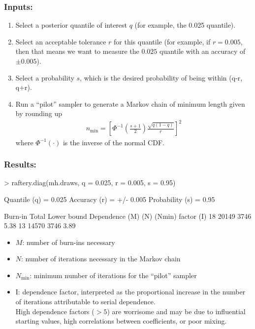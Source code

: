 \documentclass{beamer}
\begin{document}
\begin{frame}
\frametitle{Inputs:}
\pause
\begin{enumerate}
\item Select a posterior quantile of interest $q$ (for example, the
0.025 quantile).
\pause
\item Select an acceptable tolerance $r$ for this quantile \pause (for
example, if $r = 0.005$, then that means we want to measure the
$0.025$ quantile with an accuracy of $\pm 0.005$).
\pause
\item Select a probability $s$, which is the desired probability of
being within (q-r, q+r).
\pause
\item Run a ``pilot'' sampler to generate a Markov chain of minimum
length given by rounding up
\begin{eqnarray*}
n_{\mathrm{min}} = \left[ \Phi^{-1} \left( \frac{s+1}{2} \right)
\frac{\sqrt{q(1-q)}}{r} \right] ^2
\end{eqnarray*}
where $\Phi^{-1} (\cdot)$ is the inverse of the normal CDF.
\end{enumerate}
\end{frame}

\begin{frame}[fragile]
\frametitle{Results:}
\pause
\tiny
\begin{Schunk}
\begin{Sinput}
> raftery.diag(mh.draws, q = 0.025, r = 0.005, s = 0.95)
\end{Sinput}
\begin{Soutput}
Quantile (q) = 0.025
Accuracy (r) = +/- 0.005
Probability (s) = 0.95 
                                       
 Burn-in  Total Lower bound  Dependence
 (M)      (N)   (Nmin)       factor (I)
 18       20149 3746         5.38      
 13       14570 3746         3.89      
\end{Soutput}
\end{Schunk}
\normalsize
\pause
\begin{itemize}
\item $M$: number of burn-ins necessary
\pause
\item $N$: number of iterations necessary in the Markov chain
\pause
\item $N_{\mathrm{min}}$: minimum number of iterations for
the ``pilot'' sampler
\pause
\item I: dependence factor, interpreted as the proportional increase
in the number of iterations attributable to serial dependence.  \\
\pause
\bigskip
High dependence factors ($> 5$) are worrisome and may be due to
influential starting values, high correlations between coefficients,
or poor mixing.
\end{itemize}
\end{frame}
\end{document}
